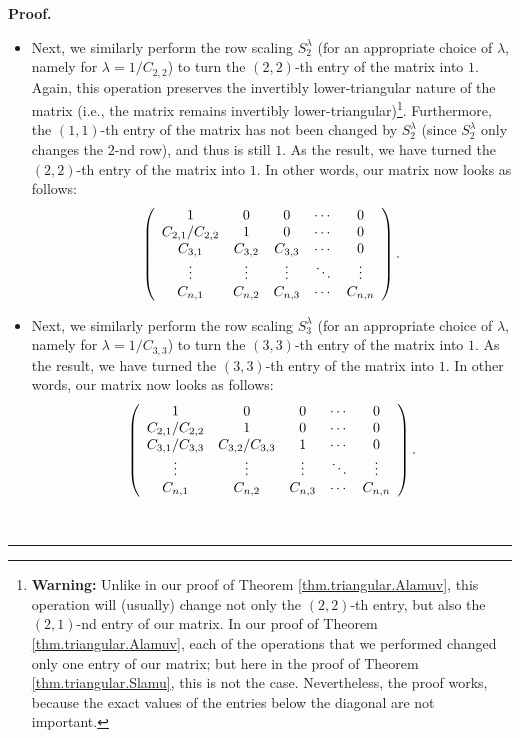 \documentclass[numbers=enddot,12pt,final,onecolumn,notitlepage]{scrartcl}%
\theoremstyle{definition}
\newenvironment{proof}[1][Proof]{\noindent\textbf{#1.} }{\ \rule{0.5em}{0.5em}}
\begin{document}
\begin{proof}
\begin{itemize}
\item Next, we similarly perform the row scaling $S_{2}^{\lambda}$ (for an
appropriate choice of $\lambda$, namely for $\lambda=1/C_{2,2}$) to turn the
$\left(  2,2\right)  $-th entry of the matrix into $1$. Again, this operation
preserves the invertibly lower-triangular nature of the matrix (i.e., the
matrix remains invertibly lower-triangular)\footnote{\textbf{Warning:} Unlike
in our proof of Theorem \ref{thm.triangular.Alamuv}, this operation will
(usually) change not only the $\left(  2,2\right)  $-th entry, but also the
$\left(  2,1\right)  $-nd entry of our matrix. In our proof of Theorem
\ref{thm.triangular.Alamuv}, each of the operations that we performed changed
only one entry of our matrix; but here in the proof of Theorem
\ref{thm.triangular.Slamu}, this is not the case. Nevertheless, the proof
works, because the exact values of the entries below the diagonal are not
important.}. Furthermore, the $\left(  1,1\right)  $-th entry of the matrix
has not been changed by $S_{2}^{\lambda}$ (since $S_{2}^{\lambda}$ only
changes the $2$-nd row), and thus is still $1$. As the result, we have turned
the $\left(  2,2\right)  $-th entry of the matrix into $1$. In other words,
our matrix now looks as follows:
\[
\left(
\begin{array}
[c]{ccccc}%
1 & 0 & 0 & \cdots & 0\\
C_{2,1}/C_{2,2} & 1 & 0 & \cdots & 0\\
C_{3,1} & C_{3,2} & C_{3,3} & \cdots & 0\\
\vdots & \vdots & \vdots & \ddots & \vdots\\
C_{n,1} & C_{n,2} & C_{n,3} & \cdots & C_{n,n}%
\end{array}
\right)  .
\]


\item Next, we similarly perform the row scaling $S_{3}^{\lambda}$ (for an
appropriate choice of $\lambda$, namely for $\lambda=1/C_{3,3}$) to turn the
$\left(  3,3\right)  $-th entry of the matrix into $1$. As the result, we have
turned the $\left(  3,3\right)  $-th entry of the matrix into $1$. In other
words, our matrix now looks as follows:
\[
\left(
\begin{array}
[c]{ccccc}%
1 & 0 & 0 & \cdots & 0\\
C_{2,1}/C_{2,2} & 1 & 0 & \cdots & 0\\
C_{3,1}/C_{3,3} & C_{3,2}/C_{3,3} & 1 & \cdots & 0\\
\vdots & \vdots & \vdots & \ddots & \vdots\\
C_{n,1} & C_{n,2} & C_{n,3} & \cdots & C_{n,n}%
\end{array}
\right)  .
\]



\end{itemize}
\end{proof}
\end{document}

